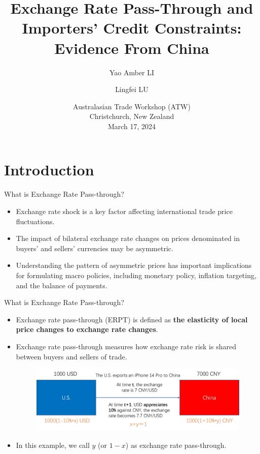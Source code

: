 \documentclass[10pt]{beamer}
\title[ERPT]{Exchange Rate Pass-Through and Importers' Credit Constraints: Evidence From China}
\author[Li \& Lu]{Yao Amber LI\inst{*} \and Lingfei LU\inst{*}}
\institute[2024]{\inst{*} \small The Hong Kong University of Science and Technology}
\date{Australasian Trade Workshop (ATW) \\ \vspace{3mm} Christchurch, New Zealand \\ \vspace{4mm} March 17, 2024 }
\begin{document}
	
\begin{frame}
    \maketitle
    \centering
\end{frame}


\section{Introduction}

\begin{frame}{What is Exchange Rate Pass-through?}
	\begin{itemize}
		\item Exchange rate shock is a key factor affecting international trade price fluctuations.
		\item The impact of bilateral exchange rate changes on prices denominated in buyers' and sellers' currencies may be asymmetric.
		\item Understanding the pattern of asymmetric prices has important implications for formulating macro policies, including monetary policy, inflation targeting, and the balance of payments.
	\end{itemize}
\end{frame}

\begin{frame}{What is Exchange Rate Pass-through?}
	\begin{itemize}
		\item Exchange rate pass-through (ERPT) is defined as \textbf{the elasticity of local price changes to exchange rate changes}.
		\item Exchange rate pass-through measures how exchange rate risk is shared between buyers and sellers of trade.
	\begin{figure}[htbp]
		\centering
		\includegraphics[width=0.9\columnwidth]{ERPT.jpg}
		\label{ERPT}
	\end{figure}
		\item In this example, we call $y$ (or $1-x$) as exchange rate pass-through.
	\end{itemize}
\end{frame}
\end{document}

